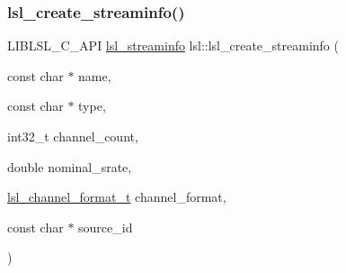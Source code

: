 \subsubsection{\texorpdfstring{lsl\+\_\+create\+\_\+streaminfo()}{lsl\_create\_streaminfo()}}
{\footnotesize\ttfamily L\+I\+B\+L\+S\+L\+\_\+\+C\+\_\+\+A\+PI \hyperlink{namespacelsl_aa0a9ce9956061679949daa2e35aae2e8}{lsl\+\_\+streaminfo} lsl\+::lsl\+\_\+create\+\_\+streaminfo (\begin{DoxyParamCaption}\item[{const char $\ast$}]{name,  }\item[{const char $\ast$}]{type,  }\item[{int32\+\_\+t}]{channel\+\_\+count,  }\item[{double}]{nominal\+\_\+srate,  }\item[{\hyperlink{namespacelsl_af188e978739868560b53dbf0ddd58e66}{lsl\+\_\+channel\+\_\+format\+\_\+t}}]{channel\+\_\+format,  }\item[{const char $\ast$}]{source\+\_\+id }\end{DoxyParamCaption})}

